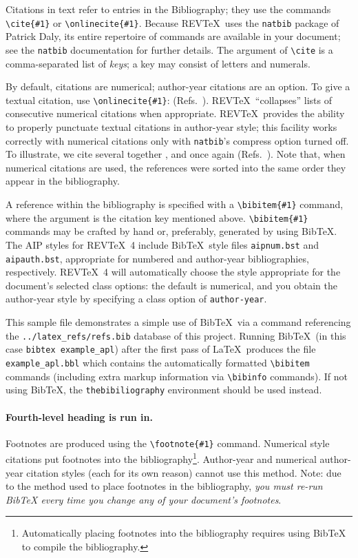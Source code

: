 \documentclass[%
 aip,
 amsmath,amssymb,
 reprint,%
]{revtex4-2}
\begin{document}
Citations in text refer to entries in the Bibliography;
they use the commands \verb+\cite{#1}+ or \verb+\onlinecite{#1}+. 
Because REV\TeX\ uses the \verb+natbib+ package of Patrick Daly, 
its entire repertoire of commands are available in your document;
see the \verb+natbib+ documentation for further details.
The argument of \verb+\cite+ is a comma-separated list of \emph{keys};
a key may consist of letters and numerals. 

By default, citations are numerical; \cite{wang2024pmut} author-year citations are an option. 
To give a textual citation, use \verb+\onlinecite{#1}+: (Refs.~). 
REV\TeX\ ``collapses'' lists of consecutive numerical citations when appropriate. 
REV\TeX\ provides the ability to properly punctuate textual citations in author-year style;
this facility works correctly with numerical citations only with \texttt{natbib}'s compress option turned off. 
To illustrate, we cite several together \cite{wang2024pmut}, 
and once again (Refs.~). 
Note that, when numerical citations are used, the references were sorted into the same order they appear in the bibliography. 

A reference within the bibliography is specified with a \verb+\bibitem{#1}+ command,
where the argument is the citation key mentioned above. 
\verb+\bibitem{#1}+ commands may be crafted by hand or, preferably,
generated by using Bib\TeX. 
The AIP styles for REV\TeX~4 include Bib\TeX\ style files
\verb+aipnum.bst+ and \verb+aipauth.bst+, appropriate for
numbered and author-year bibliographies,
respectively. 
REV\TeX~4 will automatically choose the style appropriate for 
the document's selected class options: the default is numerical, and
you obtain the author-year style by specifying a class option of \verb+author-year+.

This sample file demonstrates a simple use of Bib\TeX\ 
via a \verb++ command referencing the
\verb+../latex_refs/refs.bib+ database of this project.
Running Bib\TeX\ (in this case \texttt{bibtex
example\_apl}) after the first pass of \LaTeX\ produces the file
\verb+example_apl.bbl+ which contains the automatically formatted
\verb+\bibitem+ commands (including extra markup information via
\verb+\bibinfo+ commands). If not using Bib\TeX, the
\verb+thebibiliography+ environment should be used instead.

\paragraph{Fourth-level heading is run in.}%
Footnotes are produced using the \verb+\footnote{#1}+ command. 
Numerical style citations put footnotes into the 
bibliography\footnote{Automatically placing footnotes into the bibliography requires using BibTeX to compile the bibliography.}.
Author-year and numerical author-year citation styles (each for its own reason) cannot use this method. 
Note: due to the method used to place footnotes in the bibliography, \emph{you
must re-run BibTeX every time you change any of your document's
footnotes}. 
\end{document}
